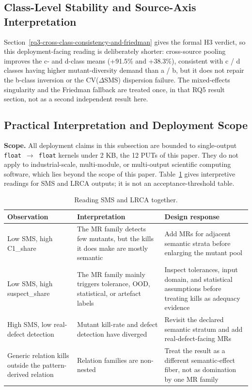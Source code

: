 \documentclass[manuscript,screen,review]{acmart}
\begin{document}
\subsection{Class-Level Stability and Source-Axis Interpretation}\label{h4-partial-across-same-source-and-cross-source}

Section~\ref{rq3-cross-class-consistency-and-friedman} gives the formal
H3 verdict, so this deployment-facing reading is deliberately shorter:
cross-source pooling improves the c- and d-class means (+91.5\% and
+38.3\%), consistent with c / d classes having higher mutant-diversity
demand than a / b, but it does not repair the b-class inversion or the
CV($\Delta$SMS) dispersion failure. The mixed-effects singularity and the
Friedman fallback are treated once, in that RQ5 result section, not as a
second independent result here.

\subsection{Practical Interpretation and Deployment Scope}\label{stakeholder-analysis-single-output-kernels-scope}

\textbf{Scope.} All deployment claims in this subsection are bounded to
single-output \texttt{float\ $\to$\ float} kernels under 2 KB, the 12 PUTs
of this paper. They do not apply to industrial-scale, multi-module, or
multi-output scientific computing software, which lies beyond the scope of this paper.
Table~\ref{tab:sms-lrca-reading} gives interpretive readings for SMS and
LRCA outputs; it is not an acceptance-threshold table.

{%
\begin{longtable}[]{@{}
  >{\raggedright\arraybackslash}p{}
  >{\raggedright\arraybackslash}p{}
  >{\raggedright\arraybackslash}p{}@{}}
\caption{Reading SMS and LRCA together.}\label{tab:sms-lrca-reading}\\
\toprule\noalign{}
Observation & Interpretation & Design response \\
\midrule\noalign{}
\endfirsthead
\endhead
\bottomrule\noalign{}
\endlastfoot
Low SMS, high C1\_share & The MR family detects few mutants, but the
kills it does make are mostly semantic & Add MRs for adjacent semantic
strata before enlarging the mutant pool \\
Low SMS, high suspect\_share & The MR family mainly triggers tolerance,
OOD, statistical, or artefact labels & Inspect tolerances, input domain,
and statistical assumptions before treating kills as adequacy evidence \\
High SMS, low real-defect detection & Mutant kill-rate and defect
detection have diverged & Revisit the declared semantic stratum and add
real-defect-facing MRs \\
Generic relation kills outside the pattern-derived relation & Relation
families are non-nested & Treat the result as a different
semantic-effect fiber, not as domination by one MR family \\
\end{longtable}
}
\end{document}
